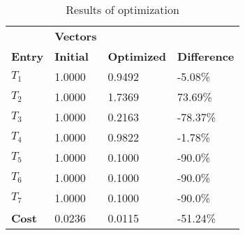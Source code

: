 \begin{table}[H]
\centering
\begin{tabular}{llll}
\textbf{}      & \cellcolor[HTML]{EFEFEF}\textbf{Vectors} & \textbf{} & \textbf{}         \\
\rowcolor[HTML]{EFEFEF} 
\textbf{Entry} & \textbf{Initial} & \textbf{Optimized} & \textbf{Difference} \\
$T_1$ & 1.0000 & 0.9492 & -5.08\% \\ 
$T_2$ & 1.0000 & 1.7369 & 73.69\% \\ 
$T_3$ & 1.0000 & 0.2163 & -78.37\% \\ 
$T_4$ & 1.0000 & 0.9822 & -1.78\% \\ 
$T_5$ & 1.0000 & 0.1000 & -90.0\% \\ 
$T_6$ & 1.0000 & 0.1000 & -90.0\% \\ 
$T_7$ & 1.0000 & 0.1000 & -90.0\% \\ 
\rowcolor[HTML]{EFEFEF} 
\textbf{Cost}  & 0.0236 & 0.0115 & -51.24\% \\ 
\end{tabular}
\caption{Results of optimization}
\label{tab:OptimizationAnalysis}
\end{table}
